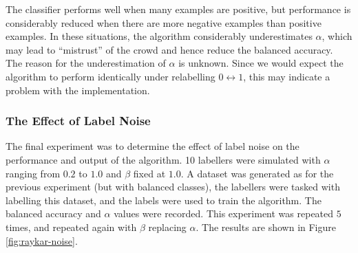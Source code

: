             The classifier performs well when many examples are positive, but
            performance is considerably reduced when there are more negative
            examples than positive examples. In these situations, the algorithm
            considerably underestimates $\alpha$, which may lead to ``mistrust''
            of the crowd and hence reduce the balanced accuracy. The reason for
            the underestimation of $\alpha$ is unknown. Since we would expect
            the algorithm to perform identically under relabelling $0
            \leftrightarrow 1$, this may indicate a problem with the
            implementation.

        \subsubsection{The Effect of Label Noise}

            The final experiment was to determine the effect of label noise on
            the performance and output of the algorithm. 10 labellers were
            simulated with $\alpha$ ranging from $0.2$ to $1.0$ and $\beta$
            fixed at $1.0$. A dataset was generated as for the previous
            experiment (but with balanced classes), the labellers were tasked
            with labelling this dataset, and the labels were used to train the
            algorithm. The balanced accuracy and $\alpha$ values were recorded.
            This experiment was repeated $5$ times, and repeated again with
            $\beta$ replacing $\alpha$. The results are shown in Figure
            \ref{fig:raykar-noise}.

